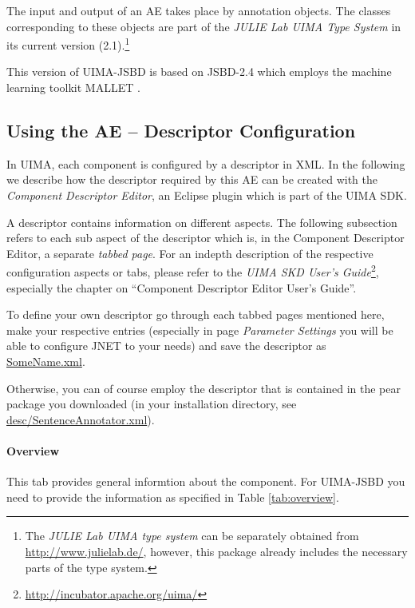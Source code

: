 \documentclass[11pt,a4paper,halfparskip]{scrartcl}
\begin{document}
The input and output of an AE takes place by annotation objects. The
classes corresponding to these objects are part of the \emph{JULIE Lab
  UIMA Type System} in its current version (2.1).\footnote{The
  \emph{JULIE Lab UIMA type system} can be separately obtained from
  \url{http://www.julielab.de/}, however, this package already
  includes the necessary parts of the type system.}

This version of UIMA-JSBD is based on JSBD-2.4 which employs the
machine learning toolkit MALLET \cite{mccallum2002}.




\subsection{Using the AE -- Descriptor Configuration}

In UIMA, each component is configured by a descriptor in XML. In the
following we describe how the descriptor required by this AE can be
created with the \emph{Component Descriptor Editor}, an Eclipse plugin
which is part of the UIMA SDK.

A descriptor contains information on different aspects. The following
subsection refers to each sub aspect of the descriptor which is, in
the Component Descriptor Editor, a separate \emph{tabbed page}. For an
indepth description of the respective configuration aspects or tabs,
please refer to the \emph{UIMA SKD User's
  Guide}\footnote{\url{http://incubator.apache.org/uima/}}, especially
the chapter on ``Component Descriptor Editor User's Guide''.

To define your own descriptor go through each tabbed pages mentioned
here, make your respective entries (especially in page \emph{Parameter
  Settings} you will be able to configure JNET to your needs) and save
the descriptor as \url{SomeName.xml}.

Otherwise, you can of course employ the descriptor that is contained
in the pear package you downloaded (in your installation directory, see
\url{desc/SentenceAnnotator.xml}).

\paragraph{Overview}
This tab provides general informtion about the component. For 
UIMA-JSBD you need to provide the information as specified in Table
\ref{tab:overview}.
\end{document}
